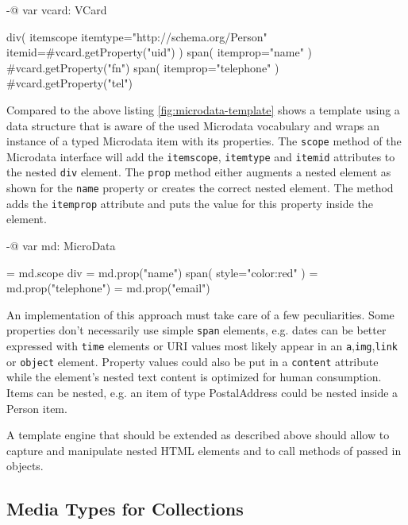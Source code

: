 \documentclass[12pt,a4paper]{scrartcl}		%
\begin{document}
\begin{anylisting}[label=fig:naive-microdata-template,
                   caption={Defining all Microdata attributes manually in an HTML template}]
-@ var vcard: VCard

div( itemscope itemtype="http://schema.org/Person" 
     itemid=#{vcard.getProperty("uid")} )
  span( itemprop="name" )
    #{vcard.getProperty("fn")}
  span( itemprop="telephone" ) 
    #{vcard.getProperty("tel")}
\end{anylisting}

Compared to the above listing \ref{fig:microdata-template} shows a template
using a data structure that is aware of the used Microdata vocabulary and wraps
an instance of a typed Microdata item with its properties. The
\lstinline:scope: method of the Microdata interface will add the
\lstinline:itemscope:, \lstinline:itemtype: and \lstinline:itemid: attributes to
the nested \lstinline:div: element. The \lstinline:prop: method either augments
a nested element as shown for the \lstinline:name: property or creates the
correct nested element. The method adds the \lstinline:itemprop: attribute and
puts the value for this property inside the element.

\begin{anylisting}[label=fig:microdata-template,
                   caption={Using a Microdata-aware data structure in a template}]
-@ var md: MicroData

= md.scope
  div
    = md.prop("name")
      span( style="color:red" )
    = md.prop("telephone")
    = md.prop("email")
\end{anylisting}

An implementation of this approach must take care of a few
peculiarities.\cite{Hickson2011} Some properties don't necessarily use simple
\lstinline:span: elements, e.g. dates can be better expressed with
\lstinline:time: elements or URI values most likely appear in an
\lstinline:a:,\lstinline:img:,\lstinline:link: or \lstinline:object:
element. Property values could also be put in a \lstinline:content: attribute
while the element's nested text content is optimized for human
consumption. Items can be nested, e.g. an item of type PostalAddress could be
nested inside a Person item.

A template engine that should be extended as described above should allow to
capture and manipulate nested HTML elements and to call methods of passed in
objects.

\subsection{Media Types for Collections}
\end{document}
